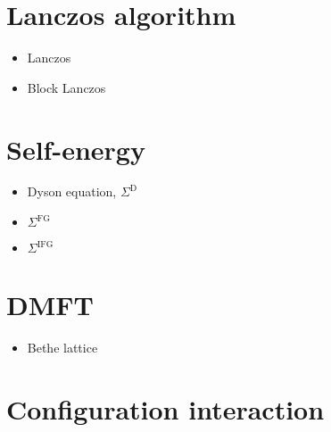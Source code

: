 \section{Lanczos algorithm}

\begin{itemize}
    \item Lanczos
    \item Block Lanczos
\end{itemize}

\section{Self-energy}

\begin{itemize}
    \item Dyson equation, $\Sigma^\mathrm{D}$
    \item $\Sigma^\mathrm{FG}$
    \item $\Sigma^\mathrm{IFG}$
\end{itemize}

\section{DMFT}

\begin{itemize}
    \item Bethe lattice
\end{itemize}

\section{Configuration interaction}
